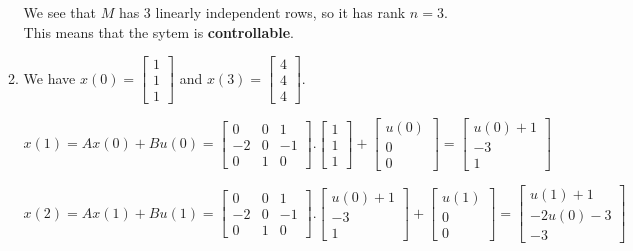 \documentclass[12pt,a4paper, margin=1in]{article}
\begin{document}
\begin{enumerate}
\begin{enumerate}
We see that $M$ has 3 linearly independent rows, so it has rank $n = 3$. \\ This means that the sytem is \textbf{controllable}.

            \item We have $
            x(0) = \begin{bmatrix}
       1 \\ 1 \\ 1 
    \end{bmatrix}
            $ and $
            x(3) = \begin{bmatrix}
       4 \\ 4 \\ 4
    \end{bmatrix}
            $.

\begin{center}
    $x(1) = Ax(0) + Bu(0) = \begin{bmatrix}
        0 & 0 & 1 \\
        -2 & 0 & -1 \\
        0 & 1 & 0
    \end{bmatrix}.\begin{bmatrix}
       1 \\ 1 \\ 1 
    \end{bmatrix} + \begin{bmatrix}
       u(0)  \\ 0 \\ 0 
    \end{bmatrix} = \begin{bmatrix}
       u(0) +  1 \\ -3 \\ 1 
    \end{bmatrix}$
\end{center}
\begin{center}
    $x(2) =  Ax(1) + Bu(1) =
\begin{bmatrix}
        0 & 0 & 1 \\
        -2 & 0 & -1 \\
        0 & 1 & 0
    \end{bmatrix}.
\begin{bmatrix}
       u(0) +  1 \\ -3 \\ 1 
    \end{bmatrix} + \begin{bmatrix}
       u(1)  \\ 0 \\ 0 
    \end{bmatrix} = 
\begin{bmatrix}
       u(1) +  1 \\ -2u(0)-3 \\ -3 
    \end{bmatrix}
    $ 
\end{center}


\end{enumerate}
\end{enumerate}
\end{document}
